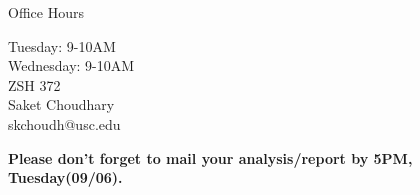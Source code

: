 \documentclass[10pt]{beamer}
\begin{document}

\begin{frame}[fragile]{Office Hours}
\Large \begin{center}Tuesday: 9-10AM\\
Wednesday: 9-10AM\\
ZSH 372\\
\vspace*{2cm}
Saket Choudhary\\ 
skchoudh@usc.edu\\
\end{center}

\textbf{Please don't forget to mail your analysis/report by 5PM, Tuesday(09/06).}

\end{frame}
\end{document}
